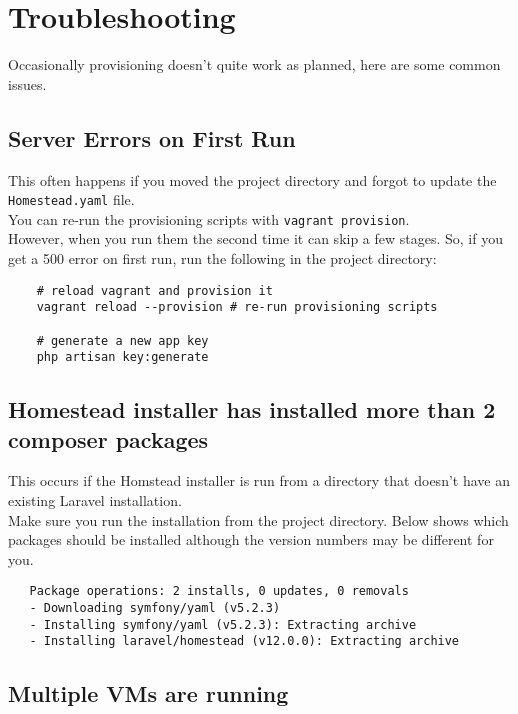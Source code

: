 \section{Troubleshooting}

Occasionally provisioning doesn't quite work as planned, here are some common issues.

\subsection{Server Errors on First Run}

This often happens if you moved the project directory and forgot to update the \texttt{Homestead.yaml} file.
\\

You can re-run the provisioning scripts with \texttt{vagrant provision}.
\\

However, when you run them the second time it can skip a few stages. So, if you get a 500 error on first run, run the following in the project directory:

\begin{verbatim}
    # reload vagrant and provision it
    vagrant reload --provision # re-run provisioning scripts

    # generate a new app key
    php artisan key:generate
\end{verbatim}

\subsection{Homestead installer has installed more than 2 composer packages}

This occurs if the Homstead installer is run from a directory that doesn't have an existing Laravel installation.
\\

Make sure you run the installation from the project directory. Below shows which packages should be installed although the version numbers may be different for you.

\begin{verbatim}
   Package operations: 2 installs, 0 updates, 0 removals
   - Downloading symfony/yaml (v5.2.3)
   - Installing symfony/yaml (v5.2.3): Extracting archive
   - Installing laravel/homestead (v12.0.0): Extracting archive
\end{verbatim}

\subsection{Multiple VMs are running}

